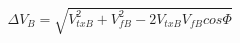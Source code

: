 \begin{equation*}
\Delta V_{B} = \sqrt{V_{txB}^2 + V_{fB}^2 - 2V_{txB}V_{fB}cos \Phi} \tag{4.68}
\end{equation*}
